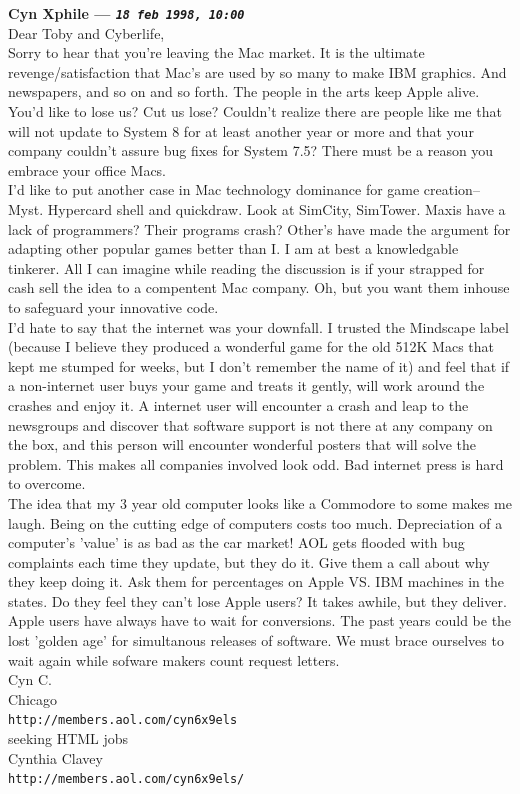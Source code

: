 \documentclass[11pt,twoside,a4paper]{article}
\begin{document}
\begin{multicols*}{2}
	
		
\textbf{Cyn Xphile --- \emph{\texttt{18 feb 1998, 10:00}}}~\\

Dear Toby and Cyberlife,~\\
Sorry to hear that you're leaving the Mac market.  It is the ultimate revenge/satisfaction that Mac's are used by so many to make IBM graphics.  And newspapers, and so on and so forth.  The people in the arts keep Apple alive. You'd like to lose us?  Cut us lose?  Couldn't realize there are people like me that will not update to System 8 for at least another year or more and that your company couldn't assure bug fixes for System 7.5?  There must be a reason you embrace your office Macs.~\\

I'd like to put another case in Mac technology dominance for game creation-- Myst.  Hypercard shell and quickdraw.  Look at SimCity, SimTower.  Maxis have a lack of programmers?  Their programs crash? Other's have made the argument for adapting other popular games better than I.  I am at best a knowledgable tinkerer.  All I can imagine while reading the discussion is if your strapped for cash sell the idea to a compentent Mac company.  Oh, but you want them inhouse to safeguard your innovative code.~\\

I'd hate to say that the internet was your downfall.  I trusted the Mindscape label (because I believe they produced a wonderful game for the old 512K Macs that kept me stumped for weeks, but I don't remember the name of it) and feel that if a non-internet user buys your game and treats it gently, will work around the crashes and enjoy it.  A internet user will encounter a crash and leap to the newsgroups and discover that software support is not there at any company on the box, and this person will encounter wonderful posters that will solve the problem.  This makes all companies involved look odd.  Bad internet press is hard to overcome.~\\ 

The idea that my 3 year old computer looks like a Commodore to some makes me laugh.  Being on the cutting edge of computers costs too much.  Depreciation of a computer's 'value' is as bad as the car market!  AOL gets flooded with bug complaints each time they update, but they do it.  Give them a call about why they keep doing it.  Ask them for percentages on Apple VS. IBM machines in the states.  Do they feel they can't lose Apple users?  It takes awhile, but they deliver.  Apple users have always have to wait for conversions.  The past years could be the lost 'golden age' for simultanous releases of software.  We must brace ourselves to wait again while sofware makers count request letters.~\\
Cyn C.~\\
Chicago~\\
\texttt{http://members.aol.com/cyn6x9els}~\\
seeking HTML jobs~\\
Cynthia Clavey~\\
\texttt{http://members.aol.com/cyn6x9els/}~\\


\end{multicols*}
\end{document}

